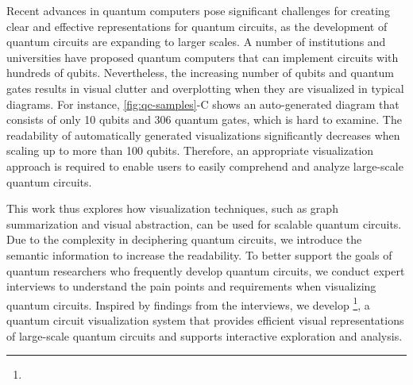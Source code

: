 Recent advances in quantum computers pose significant challenges for creating clear and effective representations for quantum circuits,
as the development of quantum circuits are expanding to larger scales.
A number of institutions and universities have proposed quantum computers that can implement circuits with hundreds of qubits.
Nevertheless, the increasing number of qubits and quantum gates results in visual clutter and overplotting when they are visualized in typical diagrams.
For instance, {\cref{fig:qc-samples}-C} shows an auto-generated diagram that consists of only 10 qubits and 306 quantum gates, which is hard to examine.
The readability of automatically generated visualizations significantly decreases when scaling up to more than 100 qubits.
Therefore, an appropriate visualization approach is required to enable users to easily comprehend and analyze large-scale quantum circuits.


This work thus explores how visualization techniques, such as graph summarization\cite{Liu:2018:GSM} and visual abstraction\cite{Viola:2018:PCAV}, can be used for scalable quantum circuits.
Due to the complexity in deciphering quantum circuits, we introduce the semantic information to increase the readability.
To better support the goals of quantum researchers who frequently develop quantum circuits, we conduct expert interviews to understand the pain points and requirements when visualizing quantum circuits.
Inspired by findings from the interviews, we develop {\tname}\footnote[1]{\metaphor}, a {{quant}um c{i}rcuit {vi}sualizatio{n} syst{e}m} that provides efficient visual representations of large-scale quantum circuits and supports interactive exploration and analysis.


